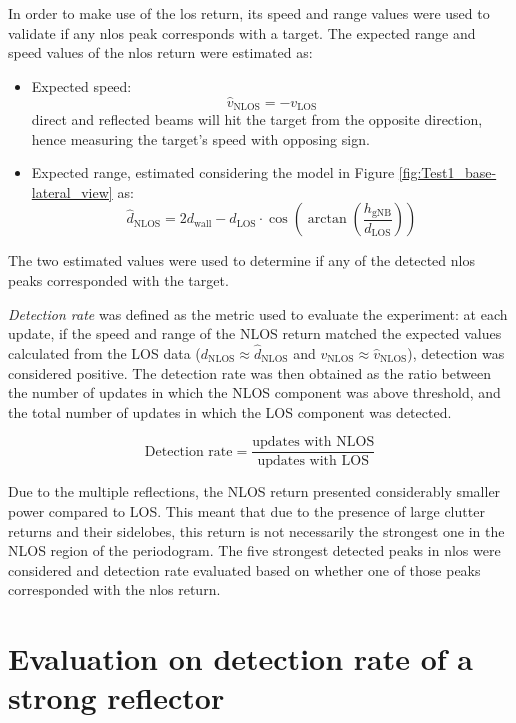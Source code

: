 In order to make use of the \gls{los} return, its speed and range values were used to validate if any \gls{nlos} peak corresponds with a target.
The expected range and speed values of the \gls{nlos} return were estimated as:

\begin{itemize}
	\item Expected speed:
	$$ \hat{v}_{\text{NLOS}} = -v_{\text{LOS}}$$
	direct and reflected beams will hit the target from the opposite direction, hence measuring the target's speed with opposing sign.
	\item Expected range, estimated considering the model in Figure \ref{fig:Test1_base-lateral_view} as:
	$$ \hat{d}_{\text{NLOS}} = 2 d_{\text{wall}} - d_{\text{LOS}}\cdot \cos{\left(\arctan{\left(\frac{h_{\text{gNB}}}{d_{\text{LOS}}}\right)}\right)}$$
\end{itemize}

The two estimated values were used to determine if any of the detected \gls{nlos} peaks corresponded with the target.

\textit{Detection rate} was defined as the metric used to evaluate the experiment: at each update, if the speed and range of the NLOS return matched the expected values calculated from the LOS data ($d_{\text{NLOS}} \approx  \hat{d}_{\text{NLOS}}$ and $v_{\text{NLOS}} \approx \hat{v}_{\text{NLOS}}$), detection was considered positive.
The detection rate was then obtained as the ratio between the number of updates in which the NLOS component was above threshold, and the total number of updates in which the LOS component was detected.


\begin{equation*}
	\text{Detection rate} = \frac{\text{updates with NLOS}}{\text{updates with LOS}}
\end{equation*}

Due to the multiple reflections, the NLOS return presented considerably smaller power compared to LOS.
This meant that due to the presence of large clutter returns and their sidelobes, this return is not necessarily the strongest one in the NLOS region of the periodogram.
The five strongest detected peaks in \gls{nlos} were considered and detection rate evaluated based on whether one of those peaks corresponded with the \gls{nlos} return.
\section{Evaluation on detection rate of a strong reflector}

